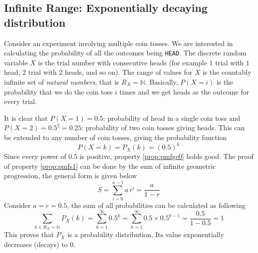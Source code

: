 \documentclass[main.tex]{article}
\begin{document}
    \subsection[Infinite]{Infinite Range: Exponentially decaying distribution}
    Consider an experiment involving multiple coin tosses. We are interested in calculating the probability of all the outcomes being \texttt{HEAD}. The discrete random variable $X$ is the trial number with consecutive heads (for example $1$ trial with $1$ head, $2$ trial with $2$ heads, and so on). The range of values for $X$ is the countably infinite set of \emph{natural numbers}, that is $R_X = \mathbb{N}$. Basically, $P(X = i)$ is the probability that we do the coin toss $i$ times and we get heads as the outcome for every trial. \par
    It is clear that $P(X=1) = 0.5$: probability of head in a single coin toss and $P(X=2) = 0.5^{2} = 0.25$: probability of two coin tosses giving heads. This can be extended to any number of coin tosses, giving the probability function
    \begin{equation}
        \label{eq:exp}
        P(X=k) = P_X(k) = (0.5)^k
    \end{equation}
    Since every power of $0.5$ is positive, property \ref{prop:pmfge0} holds good. The proof of property \ref{prop:pmfs1} can be done by the sum of infinite geometric progression, the general form is given below
    \begin{equation}
        S = \sum_{i=0}^{n-1} a \, r^i = \frac{a}{1-r}
    \end{equation}
    Consider $a=r=0.5$, the sum of all probabilities can be calculated as following
    \begin{equation}
        \label{eq:exp-s1}
        \sum_{k \in R_X = \mathbb{N}} P_X(k) = \sum_{k=1}^{\infty} 0.5^k = \sum_{k=1}^{\infty} 0.5 \times 0.5^{k-1} = \frac{0.5}{1-0.5} = 1
    \end{equation}
    This proves that $P_X$ is a probability distribution. Its value exponentially decreases (decays) to 0.
\end{document}
